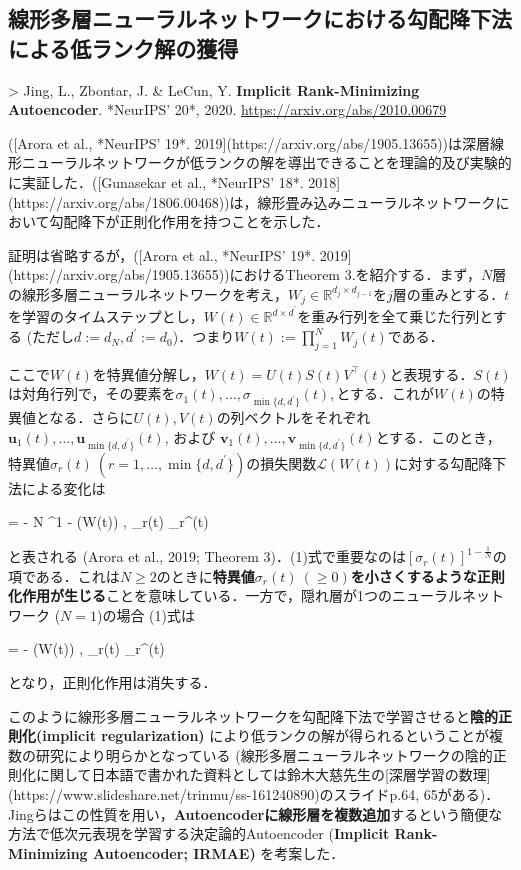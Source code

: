 \subsection{線形多層ニューラルネットワークにおける勾配降下法による低ランク解の獲得}

> Jing, L., Zbontar, J. & LeCun, Y. \textbf{Implicit Rank-Minimizing Autoencoder}. *NeurIPS' 20*, 2020. \url{https://arxiv.org/abs/2010.00679}

([Arora et al., *NeurIPS' 19*. 2019](https://arxiv.org/abs/1905.13655))は深層線形ニューラルネットワークが低ランクの解を導出できることを理論的及び実験的に実証した．([Gunasekar et al., *NeurIPS' 18*. 2018](https://arxiv.org/abs/1806.00468))は，線形畳み込みニューラルネットワークにおいて勾配降下が正則化作用を持つことを示した．

証明は省略するが，([Arora et al., *NeurIPS' 19*. 2019](https://arxiv.org/abs/1905.13655))におけるTheorem 3.を紹介する．まず，$N$層の線形多層ニューラルネットワークを考え，$W_j \in \mathbb{R}^{d_j \times d_{j−1}}$を$j$層の重みとする．$t$を学習のタイムステップとし，$W(t) \in \mathbb{R}^{d \times d^\prime}$を重み行列を全て乗じた行列とする (ただし$d := d_N, d^\prime := d_0$)．つまり$W(t):=\prod_{j=1}^N W_j(t)$である．

ここで$W(t)$を特異値分解し，$W(t) = U(t)S(t)V^\top(t)$と表現する．$S(t)$は対角行列で，その要素を$\sigma_1(t), \ldots , \sigma_{\min\{d, d^\prime\}}(t),$とする．これが$W(t)$の特異値となる．さらに$U(t), V (t)$の列ベクトルをそれぞれ $\mathbf{u}_1(t), \ldots, \mathbf{u}_{\min\{d, d^\prime\}}(t)$, および $\mathbf{v}_1(t), \ldots, \mathbf{v}_{\min\{d,d^\prime \}}(t)$とする．このとき，特異値$ \sigma_r(t)\ (r=1, \ldots, \min\{d,d^\prime \})$の損失関数$\mathcal{L}(W(t))$に対する勾配降下法による変化は


 = - N \cdot {}^{1 - } \cdot \left\langle \nabla {}(W(t)) , _r(t) _r^\top(t) \right\rangle


と表される (Arora et al., 2019; Theorem 3)．(1)式で重要なのは$\left[\sigma_r(t)\right]^{1 - \frac{1}{N}}$の項である．これは$N\geq 2$のときに\textbf{特異値$\sigma_r(t)\ (\geq 0)$を小さくするような正則化作用が生じる}ことを意味している．一方で，隠れ層が1つのニューラルネットワーク ($N=1$)の場合 (1)式は


 = - \left\langle \nabla {}(W(t)) , _r(t) _r^\top(t) \right\rangle


となり，正則化作用は消失する．

このように線形多層ニューラルネットワークを勾配降下法で学習させると\textbf{陰的正則化(implicit regularization)} により低ランクの解が得られるということが複数の研究により明らかとなっている (線形多層ニューラルネットワークの陰的正則化に関して日本語で書かれた資料としては鈴木大慈先生の[深層学習の数理](https://www.slideshare.net/trinmu/ss-161240890)のスライドp.64, 65がある)．Jingらはこの性質を用い，\textbf{Autoencoderに線形層を複数追加}するという簡便な方法で低次元表現を学習する決定論的Autoencoder (\textbf{Implicit Rank-Minimizing Autoencoder; IRMAE)} を考案した．
